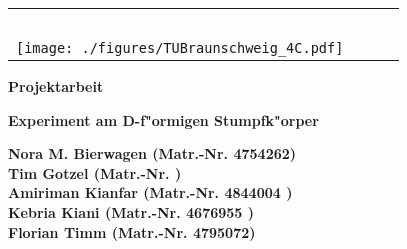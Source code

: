 \begin{titlepage}
 \centering

\begin{table}[htbp]
 \begin{center}
 \vspace{-0.5cm}
  \begin{tabular}{lcr} 
    \parbox{0.45\textwidth}{\mbox{ }} & \parbox{0.13\textwidth}{\mbox{ }} & \parbox{0.45\textwidth}{\mbox{ }} \\
    \hspace*{-2.0cm}
    \texttt{[image: ./figures/TUBraunschweig\_4C.pdf]} & 
     &  \\ %
  \end{tabular}
 \end{center}
\end{table}


 \vspace*{2.0cm}

 \textbf{\large Projektarbeit}


 \vspace*{1.5cm}
 
 \textbf{\LARGE Experiment am D-f"ormigen Stumpfk"orper} \\[0.5ex]
 


 \vspace*{1.5cm}

 \textbf{\large Nora M. Bierwagen (Matr.-Nr. 4754262)} \\
 \textbf{\large Tim Gotzel (Matr.-Nr. )} \\
 \textbf{\large Amiriman Kianfar (Matr.-Nr. 4844004 )} \\
 \textbf{\large Kebria Kiani (Matr.-Nr. 4676955 )} \\
 \textbf{\large Florian Timm (Matr.-Nr. 4795072)} \\


 \vspace*{7.0cm}


\end{titlepage}
